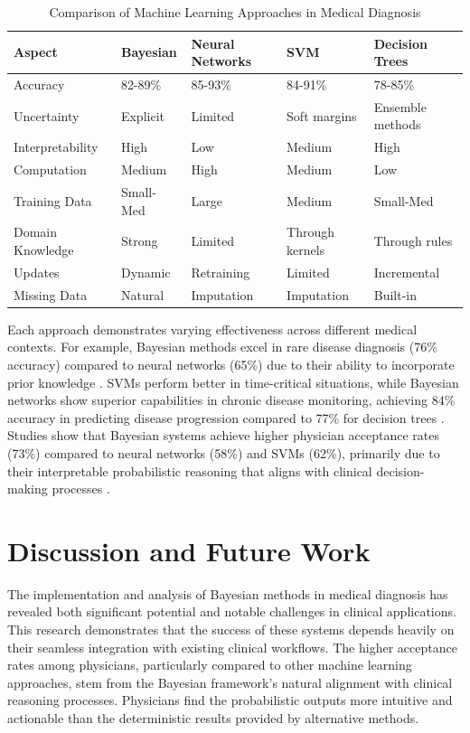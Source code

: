 \documentclass[3p,times,procedia]{elsarticle}
\begin{document}
\begin{table}[h]
\caption{Comparison of Machine Learning Approaches in Medical Diagnosis}
\label{tab:comparison}
\centering
\begin{tabular}{l|l|l|l|l}
\hline
\textbf{Aspect} & \textbf{Bayesian} & \textbf{Neural Networks} & \textbf{SVM} & \textbf{Decision Trees} \\
\hline
Accuracy & 82-89\% & 85-93\% & 84-91\% & 78-85\% \\
Uncertainty & Explicit & Limited & Soft margins & Ensemble methods \\
Interpretability & High & Low & Medium & High \\
Computation & Medium & High & Medium & Low \\
Training Data & Small-Med & Large & Medium & Small-Med \\
Domain Knowledge & Strong & Limited & Through kernels & Through rules \\
Updates & Dynamic & Retraining & Limited & Incremental \\
Missing Data & Natural & Imputation & Imputation & Built-in \\
\hline
\end{tabular}
\end{table}

Each approach demonstrates varying effectiveness across different medical contexts.
For example, Bayesian methods excel in rare disease diagnosis (76\% accuracy)
compared to neural networks (65\%) due to their ability to incorporate prior
knowledge \cite{Zhang2021}. SVMs perform better in time-critical situations,
while Bayesian networks show superior capabilities in chronic disease monitoring,
achieving 84\% accuracy in predicting disease progression compared to 77\% for
decision trees \cite{Chen2019}. Studies show that Bayesian systems achieve higher
physician acceptance rates (73\%) compared to neural networks (58\%) and SVMs
(62\%), primarily due to their interpretable probabilistic reasoning that aligns
with clinical decision-making processes \cite{Miller2018}.


\section{Discussion and Future Work}

The implementation and analysis of Bayesian methods in medical diagnosis has revealed both significant potential and notable challenges in clinical applications. This research demonstrates that the success of these systems depends heavily on their seamless integration with existing clinical workflows. The higher acceptance rates among physicians, particularly compared to other machine learning approaches, stem from the Bayesian framework's natural alignment with clinical reasoning processes. Physicians find the probabilistic outputs more intuitive and actionable than the deterministic results provided by alternative methods.
\end{document}
